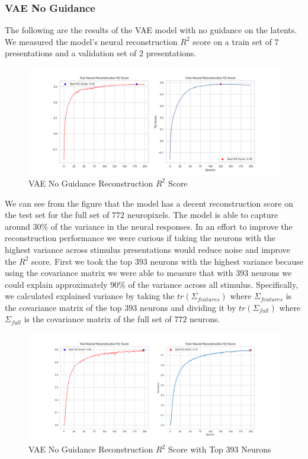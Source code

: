 \documentclass[12pt, letterpaper]{article}
\begin{document}
\subsubsection{VAE No Guidance}
The following are the results of the VAE model with no guidance on the latents. We measured the model's neural reconstruction $R^2$ score on a train set of $7$ presentations and a validation set of $2$ presentations.

\begin{figure}[H]
    \centering
    \includegraphics[width=1.0\textwidth]{x_r2_128dim_200_epochs_0.05beta_2_layer.png}
    \caption{VAE No Guidance Reconstruction $R^2$ Score}
    \label{fig:vae_no_guidance}
\end{figure}

We can see from the figure that the model has a decent reconstruction score on the test set for the full set of $772$ neuropixels. The model is able to capture around $30\%$ of the variance in the neural responses. In an effort to improve the reconstruction performance we were curious if taking the neurons with the highest variance across stimulus presentations would reduce noise and improve the $R^2$ score. First we took the top $393$ neurons with the highest variance because using the covariance matrix we were able to measure that with $393$ neurons we could explain approximately $90\%$ of the variance across all stimulus. Specifically, we calculated explained variance by taking the $tr(\Sigma_{features})$ where $\Sigma_{features}$ is the covariance matrix of the top $393$ neurons and dividing it by $tr(\Sigma_{full})$ where $\Sigma_{full}$ is the covariance matrix of the full set of $772$ neurons.

\begin{figure}[H]
    \centering
    \includegraphics[width=1.0\textwidth]{x_r2_128dim_393_top_var_200_epochs_0.05_beta_2_layer.png}
    \caption{VAE No Guidance Reconstruction $R^2$ Score with Top 393 Neurons}
    \label{fig:vae_no_guidance_top393}
\end{figure}
\end{document}
